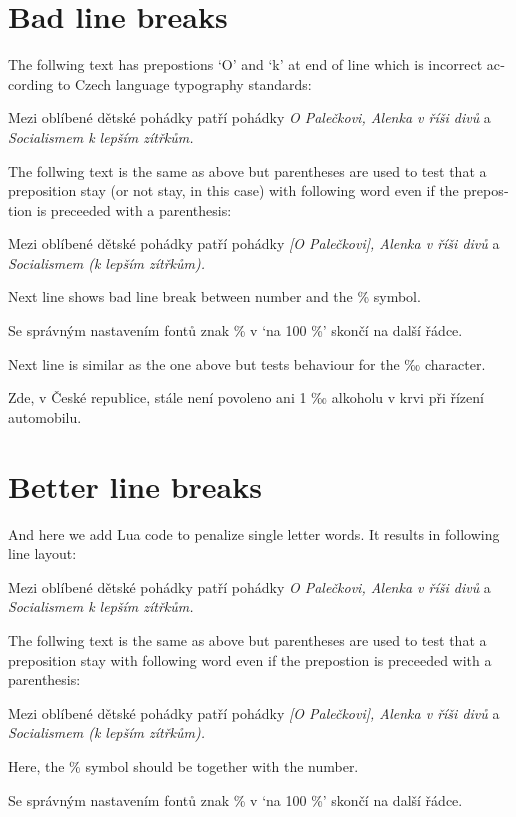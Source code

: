 \documentclass{article}
\newcommand{\expl}[1]{\begin{english}\sffamily #1\end{english}}
\begin{document}
\section{Bad line breaks}
\expl{The follwing text has prepostions `O' and `k' at end of line which
  is incorrect according to Czech language typography standards:}

Mezi oblíbené dětské pohádky patří pohádky \emph{O Palečkovi, Alenka v říši
  divů} a \emph{Socialismem k lepším zítřkům.}

\expl{The follwing text is the same as above but parentheses are used to test
  that a preposition stay (or not stay, in this case) with following word
  even if the prepostion is preceeded with a parenthesis:}

Mezi oblíbené dětské pohádky patří pohádky \emph{[O Palečkovi], Alenka v říši
  divů} a \emph{Socialismem (k lepším zítřkům).}

\expl{Next line shows bad line break between number and the \% symbol.}

Se správným nastavením fontů znak \% v `na 100 \%' skončí na další řádce.

\expl{Next line is similar as the one above but tests behaviour for the ‰
  character.}

Zde, v České republice, stále není povoleno ani 1 ‰ alkoholu v krvi při
řízení automobilu.

\section{Better line breaks}
\expl{And here we add Lua code to penalize single letter words. It results in
following line layout:}

\cstypoSingleLetterEnable{}
\cstypoPercentsEnable{}
\cstypoALetterEnable{}
Mezi oblíbené dětské pohádky patří pohádky \emph{O Palečkovi, Alenka v říši
  divů} a \emph{Socialismem k lepším zítřkům.}

\expl{The follwing text is the same as above but parentheses are used to test
  that a preposition stay with following word even if the prepostion is
  preceeded with a parenthesis:}

Mezi oblíbené dětské pohádky patří pohádky \emph{[O Palečkovi], Alenka v říši
  divů} a \emph{Socialismem (k lepším zítřkům).}

\expl{Here, the \% symbol should be together with the number.}

Se správným nastavením fontů znak \% v `na 100 \%' skončí na další řádce.
\end{document}

